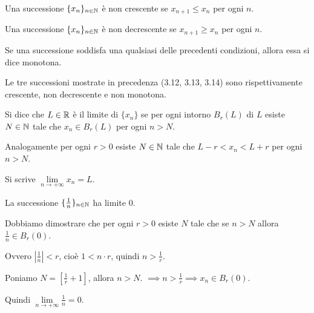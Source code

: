 \begin{definition}
Una successione $\{x_n\}_{n \in \mathbb N}$ è non crescente se $x_{n+1} \le x_n$ per ogni $n$.
\end{definition}

\begin{definition}
Una successione $\{x_n\}_{n \in \mathbb N}$ è non decrescente se $x_{n+1} \ge x_n$ per ogni $n$.
\end{definition}

Se una successione soddisfa una qualsiasi delle precedenti condizioni, allora essa si dice monotona.

\begin{example}
Le tre successioni mostrate in precedenza (3.12, 3.13, 3.14) sono rispettivamente crescente, non decrescente e non monotona.
\end{example}

\begin{definition}
Si dice che $L \in \mathbb R$ è il limite di $\{ x_n \}$ se per ogni intorno $B_r(L)$ di $L$ esiste $N \in \mathbb N$ tale che $x_n \in B_r(L)$ per ogni $n > N$.

Analogamente per ogni $r > 0$ esiste $N \in \mathbb N$ tale che $L-r < x_n < L+r$ per ogni $n > N$.

Si scrive $\lim\limits_{n \to +\infty}{x_n} = L$.
\end{definition}

\begin{example}
La successione $\{\frac{1}{n}\}_{n \in \mathbb N}$ ha limite 0.

Dobbiamo dimostrare che per ogni $r > 0$ esiste $N$ tale che se $n > N$ allora $\frac{1}{n} \in B_r(0)$.

Ovvero $|\frac{1}{n}| < r$, cioè $1 < n \cdot r$, quindi $n > \frac{1}{r}$.

Poniamo $N = [\frac{1}{r} + 1]$, allora $n > N$. $\implies n > \frac{1}{r} \implies x_n \in B_r(0)$. 

Quindi $\lim\limits_{n \to +\infty} \frac{1}{n} = 0$.
\end{example}